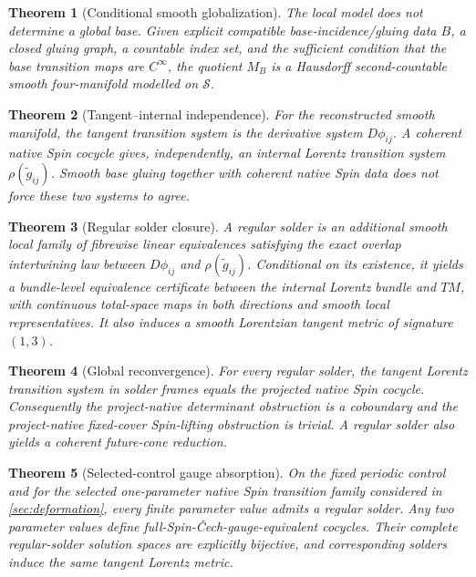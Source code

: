 \documentclass[11pt,a4paper]{article}
\newtheorem{theorem}{Theorem}[section]
\theoremstyle{definition}
\theoremstyle{remark}
\newcommand{\Smodel}{\mathcal{S}}
\newcommand{\Cech}{\ifmmode\text{\v{C}ech}\else\v{C}ech\fi}
\begin{document}
\begin{theorem}[Conditional smooth globalization]
\label{thm:intro-global}
The local model does not determine a global base.  Given explicit compatible
base-incidence/gluing data \(B\), a closed gluing graph, a countable index
set, and the sufficient condition that the base transition maps are
\(C^\infty\), the quotient \(M_B\) is a Hausdorff second-countable smooth
four-manifold modelled on \(\Smodel\).
\end{theorem}

\begin{theorem}[Tangent--internal independence]
\label{thm:intro-independence}
For the reconstructed smooth manifold, the tangent transition system is the
derivative system \(D\phi_{ij}\).  A coherent native Spin cocycle gives,
independently, an internal Lorentz transition system
\(\rho(\widetilde g_{ij})\).  Smooth base gluing together with coherent
native Spin data does not force these two systems to agree.
\end{theorem}

\begin{theorem}[Regular solder closure]
\label{thm:intro-solder}
A regular solder is an additional smooth local family of fibrewise linear
equivalences satisfying the exact overlap intertwining law between
\(D\phi_{ij}\) and \(\rho(\widetilde g_{ij})\).
Conditional on its existence, it yields a bundle-level equivalence
certificate between the internal Lorentz bundle and \(TM\), with continuous
total-space maps in both directions and smooth local representatives.  It
also induces a smooth Lorentzian tangent metric of signature \((1,3)\).
\end{theorem}

\begin{theorem}[Global reconvergence]
\label{thm:intro-reconvergence}
For every regular solder, the tangent Lorentz transition system in solder
frames equals the projected native Spin cocycle.  Consequently the
project-native determinant obstruction is a coboundary and the
project-native fixed-cover Spin-lifting obstruction is trivial.  A regular
solder also yields a coherent future-cone reduction.
\end{theorem}

\begin{theorem}[Selected-control gauge absorption]
\label{thm:intro-deformation}
On the fixed periodic control and for the selected one-parameter native Spin
transition family considered in \cref{sec:deformation}, every finite
parameter value admits a regular solder.  Any two parameter values define
full-Spin-\Cech-gauge-equivalent cocycles.  Their complete regular-solder
solution spaces are explicitly bijective, and corresponding solders induce
the same tangent Lorentz metric.
\end{theorem}
\end{document}
